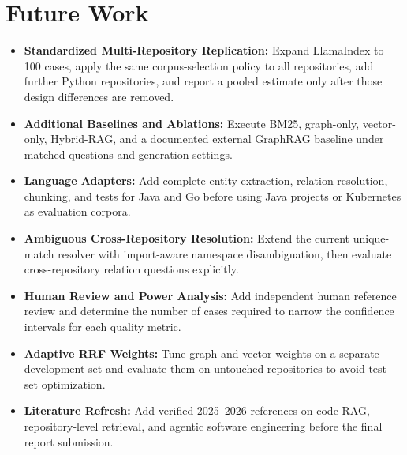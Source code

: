 \documentclass[12pt,letterpaper,oneside]{report}
\begin{document}
\section{Future Work}
\begin{itemize}
    \item \textbf{Standardized Multi-Repository Replication:} Expand LlamaIndex to 100 cases, apply the same corpus-selection policy to all repositories, add further Python repositories, and report a pooled estimate only after those design differences are removed.
    \item \textbf{Additional Baselines and Ablations:} Execute BM25, graph-only, vector-only, Hybrid-RAG, and a documented external GraphRAG baseline under matched questions and generation settings.
    \item \textbf{Language Adapters:} Add complete entity extraction, relation resolution, chunking, and tests for Java and Go before using Java projects or Kubernetes as evaluation corpora.
    \item \textbf{Ambiguous Cross-Repository Resolution:} Extend the current unique-match resolver with import-aware namespace disambiguation, then evaluate cross-repository relation questions explicitly.
    \item \textbf{Human Review and Power Analysis:} Add independent human reference review and determine the number of cases required to narrow the confidence intervals for each quality metric.
    \item \textbf{Adaptive RRF Weights:} Tune graph and vector weights on a separate development set and evaluate them on untouched repositories to avoid test-set optimization.
    \item \textbf{Literature Refresh:} Add verified 2025--2026 references on code-RAG, repository-level retrieval, and agentic software engineering before the final report submission.
\end{itemize}
\end{document}
